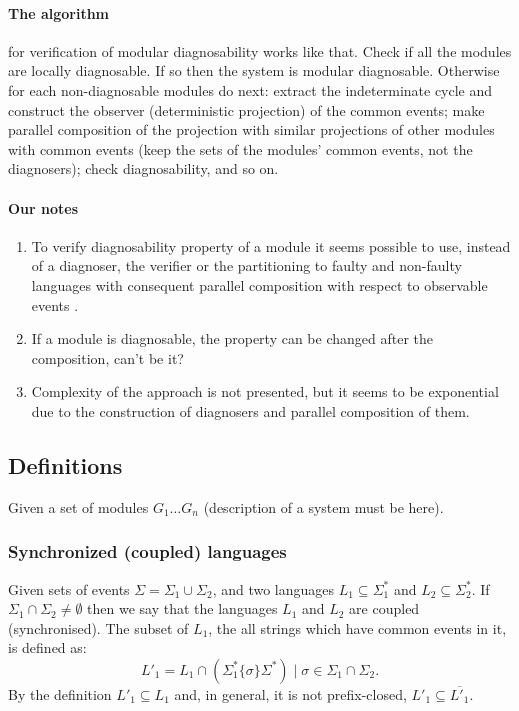 \documentclass[a4paper,oneside]{article}
\begin{document}
\paragraph{The algorithm} for verification of modular diagnosability works like
that. Check if all the modules are locally diagnosable. If so then the system is
modular diagnosable. Otherwise for each non-diagnosable modules do next: extract
the indeterminate cycle and construct the observer (deterministic projection) of
the common events; make parallel composition of the projection with similar
projections of other modules with common events (keep the sets of the
modules' common events, not the diagnosers); 
check diagnosability, and so on.

\paragraph{Our notes}
\begin{enumerate}
  \item To verify diagnosability property of a module it seems possible to use,
  instead of a diagnoser, the verifier \cite{yoo_polynomial-time_2002} or the
  partitioning to faulty and non-faulty languages with consequent parallel
  composition with respect to observable events \cite{cassez_note_2009}.
  \item If a module is diagnosable, the property can be changed after the
  composition, can't be it?
  \item Complexity of the approach is not presented, but it seems to
  be exponential due to the construction of diagnosers and parallel composition
  of them.
\end{enumerate}


\subsection{Definitions}
\label{sec_definitions}
Given a set of modules $G_1\ldots G_n$ (description of a system must be here).

\subsubsection{Synchronized (coupled) languages}
Given sets of events $\Sigma = \Sigma_1 \cup \Sigma_2$, and
two languages $L_1 \subseteq \Sigma_1^*$ and $L_2 \subseteq \Sigma_2^*$.
If $\Sigma_1 \cap \Sigma_2 \neq \emptyset$ then we say that the languages $L_1$ and
$L_2$ are coupled (synchronised). The subset of $L_1$, the all strings which
have common events in it, is defined as:
\begin{equation}
\label{eq_synchronized_language}
L'_{1} =
	L_1 \cap \left( \Sigma_1^* \{\sigma\} \Sigma^* \right) 
	\mid \sigma \in \Sigma_1 \cap \Sigma_2.
\end{equation}
By the definition $L'_1 \subseteq L_1$ and, in general, it is not
prefix-closed, $L'_1 \subseteq \overline{L'_1}$.
\end{document}
